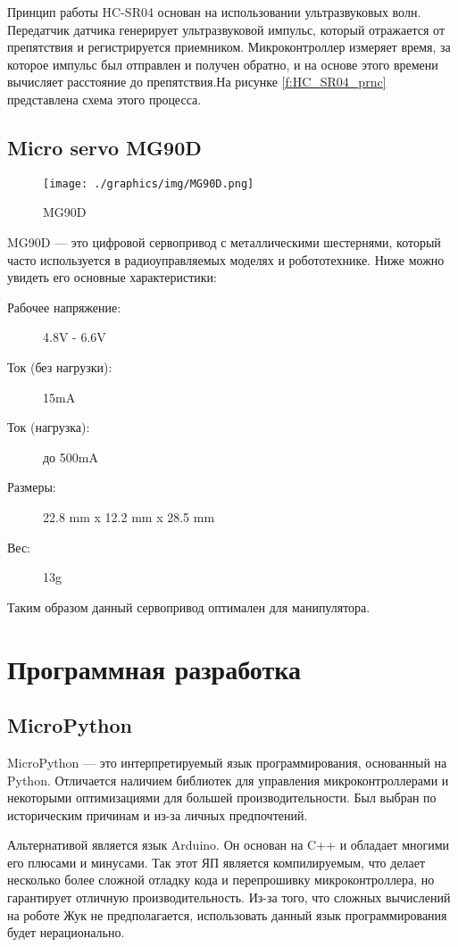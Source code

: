 Принцип работы HC-SR04 основан на использовании ультразвуковых волн. Передатчик датчика генерирует ультразвуковой импульс, который отражается от препятствия и регистрируется приемником. Микроконтроллер измеряет время, за которое импульс был отправлен и получен обратно, и на основе этого времени вычисляет расстояние до препятствия.На рисунке \ref{f:HC_SR04_prnc} представлена схема этого процесса.

\section{Micro servo MG90D}
\begin{figure}[!h]
    \texttt{[image: ./graphics/img/MG90D.png]}
    \caption{MG90D}
    \label{f:MG90D}
\end{figure}

MG90D --- это цифровой сервопривод с металлическими шестернями, который часто используется в радиоуправляемых моделях и робототехнике. Ниже можно увидеть его основные характеристики:

\begin{description}
    \item[Рабочее напряжение:] 4.8V - 6.6V
    \item[Ток (без нагрузки):] 15mA
    \item[Ток (нагрузка):] до 500mA
    \item[Размеры:] 22.8 mm x 12.2 mm x 28.5 mm
    \item[Вес:] 13g
\end{description}

Таким образом данный сервопривод оптимален для манипулятора.

\chapter{Программная разработка}
\section{MicroPython}

MicroPython --- это интерпретируемый язык программирования, основанный на Python. Отличается наличием библиотек для управления микроконтроллерами и некоторыми оптимизациями для большей производительности. Был выбран по историческим причинам и из-за личных предпочтений.

Альтернативой является язык Arduino. Он основан на C++ и обладает многими его плюсами и минусами. Так этот ЯП является компилируемым, что делает несколько более сложной отладку кода и перепрошивку микроконтроллера, но гарантирует отличную производительность. Из-за того, что сложных вычислений на роботе Жук не предполагается, использовать данный язык программирования будет нерационально.

